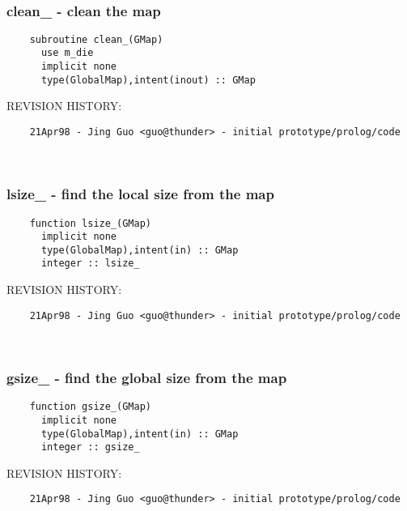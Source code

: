  
\mbox{}\hrulefill\ 
 

 \subsubsection{clean\_ - clean the map}


 
 
\begin{verbatim} 
    subroutine clean_(GMap)
      use m_die
      implicit none
      type(GlobalMap),intent(inout) :: GMap
 \end{verbatim}{\sf REVISION HISTORY:}
\begin{verbatim}  	21Apr98 - Jing Guo <guo@thunder> - initial prototype/prolog/code\end{verbatim}
 
 
\mbox{}\hrulefill\ 
 

 \subsubsection{lsize\_ - find the local size from the map}


 
 
\begin{verbatim} 
    function lsize_(GMap)
      implicit none
      type(GlobalMap),intent(in) :: GMap
      integer :: lsize_
 \end{verbatim}{\sf REVISION HISTORY:}
\begin{verbatim}  	21Apr98 - Jing Guo <guo@thunder> - initial prototype/prolog/code\end{verbatim}
 
 
\mbox{}\hrulefill\ 
 

 \subsubsection{gsize\_ - find the global size from the map}


 
 
\begin{verbatim} 
    function gsize_(GMap)
      implicit none
      type(GlobalMap),intent(in) :: GMap
      integer :: gsize_
 \end{verbatim}{\sf REVISION HISTORY:}
\begin{verbatim}  	21Apr98 - Jing Guo <guo@thunder> - initial prototype/prolog/code\end{verbatim}
 
